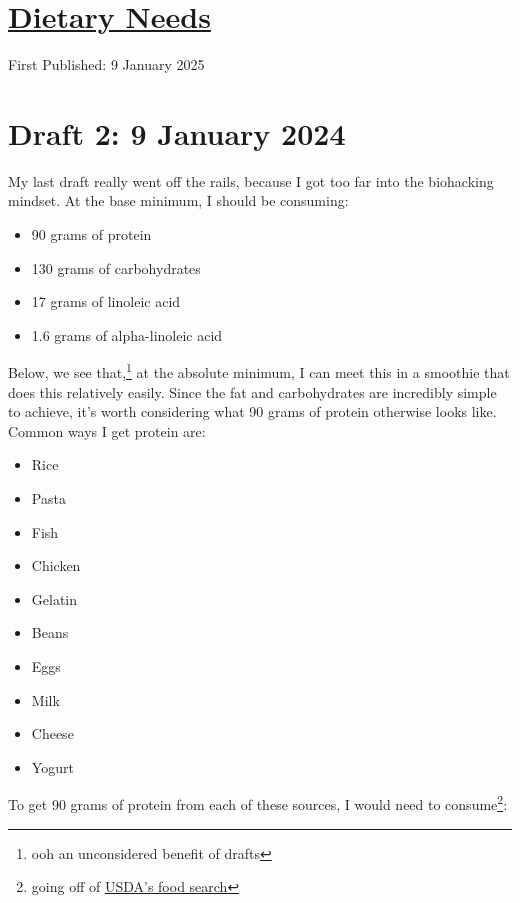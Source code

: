 \documentclass[12pt]{article}[titlepage]
\renewcommand{\,}{\textsuperscript{,}}
\begin{document}
\doublespacing
\section{\href{dietary-needs-2.html}{Dietary Needs}}

First Published: 9 January 2025

\section{Draft 2: 9 January 2024}

My last draft really went off the rails, because I got too far into the biohacking mindset. At the base minimum, I should be consuming:

\begin{itemize}  
\item 90 grams of protein  
\item 130 grams of carbohydrates  
\item 17 grams of linoleic acid  
\item 1.6 grams of alpha-linoleic acid  
\end{itemize}

Below, we see that,\footnote{ooh an unconsidered benefit of drafts} at the absolute minimum, I can meet this in a smoothie that does this relatively easily.  
Since the fat and carbohydrates are incredibly simple to achieve, it's worth considering what 90 grams of protein otherwise looks like.  
Common ways I get protein are:

\begin{itemize}  
\item Rice  
\item Pasta  
\item Fish  
\item Chicken  
\item Gelatin  
\item Beans  
\item Eggs  
\item Milk  
\item Cheese  
\item Yogurt  
\end{itemize}

To get 90 grams of protein from each of these sources, I would need to consume\footnote{going off of \href{https://fdc.nal.usda.gov/}{USDA's food search}}:
\end{document}
